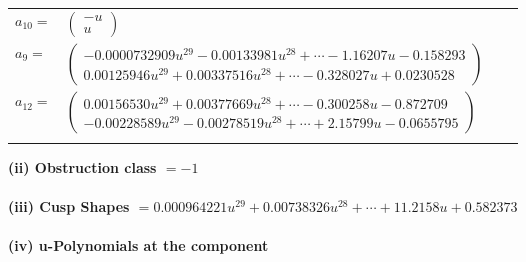 \documentclass[1p]{elsarticle_modified}
\theoremstyle{definition}
\begin{document}
\begin{tabular}{m{7pt} m{180pt} m{7pt} m{180pt} }
\flushright $a_{10}=$&$\begin{pmatrix}- u\\u\end{pmatrix}$ \\
\flushright $a_{9}=$&$\begin{pmatrix}-0.0000732909 u^{29}-0.00133981 u^{28}+\cdots-1.16207 u-0.158293\\0.00125946 u^{29}+0.00337516 u^{28}+\cdots-0.328027 u+0.0230528\end{pmatrix}$ \\
\flushright $a_{12}=$&$\begin{pmatrix}0.00156530 u^{29}+0.00377669 u^{28}+\cdots-0.300258 u-0.872709\\-0.00228589 u^{29}-0.00278519 u^{28}+\cdots+2.15799 u-0.0655795\end{pmatrix}$\\&\end{tabular}
\flushleft \textbf{(ii) Obstruction class $= -1$}\\~\\
\flushleft \textbf{(iii) Cusp Shapes $= 0.000964221 u^{29}+0.00738326 u^{28}+\cdots+11.2158 u+0.582373$}\\~\\
\newpage\renewcommand{\arraystretch}{1}
\flushleft \textbf{(iv) u-Polynomials at the component}\newline \\
\end{document}
